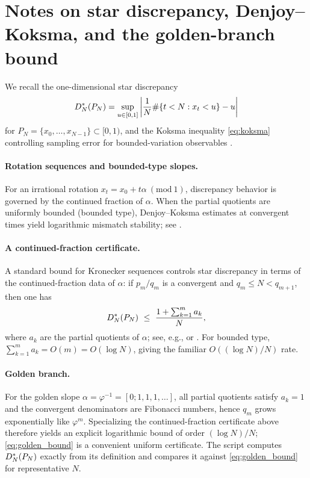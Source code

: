 
\section{Notes on star discrepancy, Denjoy--Koksma, and the golden-branch bound}
\label{app:discrepancy_notes}

We recall the one-dimensional star discrepancy
\[
D_N^\ast(P_N)
=\sup_{u\in[0,1]}
\left|\frac{1}{N}\#\{t<N:x_t<u\}-u\right|
\]
for $P_N=\{x_0,\dots,x_{N-1}\}\subset[0,1)$, and the Koksma inequality \eqref{eq:koksma} controlling sampling error for bounded-variation observables \cite{KuipersNiederreiter1974,DrmotaTichy1997}.

\paragraph{Rotation sequences and bounded-type slopes.}
For an irrational rotation $x_t=x_0+t\alpha\ (\mathrm{mod}\ 1)$, discrepancy behavior is governed by the continued fraction of $\alpha$.
When the partial quotients are uniformly bounded (bounded type), Denjoy--Koksma estimates at convergent times yield logarithmic mismatch stability; see \cite{Denjoy1932,Koksma1935,KuipersNiederreiter1974}.

\paragraph{A continued-fraction certificate.}
A standard bound for Kronecker sequences controls star discrepancy in terms of the continued-fraction data of $\alpha$:
if $p_m/q_m$ is a convergent and $q_m\le N<q_{m+1}$, then one has
\[
\DNstar(P_N)\ \le\ \frac{1+\sum_{k=1}^m a_k}{N},
\]
where $a_k$ are the partial quotients of $\alpha$; see, e.g., \cite[Ch.~2]{KuipersNiederreiter1974} or \cite[Ch.~1]{DrmotaTichy1997}.
For bounded type, $\sum_{k=1}^m a_k=O(m)=O(\log N)$, giving the familiar $O((\log N)/N)$ rate.

\paragraph{Golden branch.}
For the golden slope $\alpha=\varphi^{-1}=[0;1,1,1,\dots]$, all partial quotients satisfy $a_k=1$ and the convergent denominators are Fibonacci numbers, hence $q_m$ grows exponentially like $\varphi^m$.
Specializing the continued-fraction certificate above therefore yields an explicit logarithmic bound of order $(\log N)/N$; \eqref{eq:golden_bound} is a convenient uniform certificate.
The script  computes $D_N^\ast(P_N)$ exactly from its definition and compares it against \eqref{eq:golden_bound} for representative $N$.

